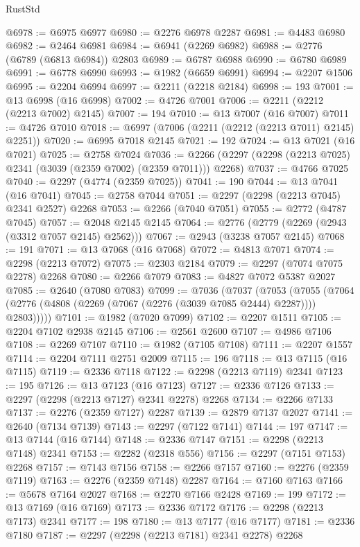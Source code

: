 \begin{lexlean}{RustStd}
\begin{coremodule}
@6978 := @6975 @6977
@6980 := @2276 @6978 @2287
@6981 := @4483 @6980
@6982 := @2464 @6981
@6984 := @6941 (@2269 @6982)
@6988 := @2776 (@6789 (@6813 @6984)) @2803
@6989 := @6787 @6988
@6990 := @6780 @6989
@6991 := @6778 @6990
@6993 := @1982 (@6659 @6991)
@6994 := @2207 @1506
@6995 := @2204 @6994
@6997 := @2211 (@2218 @2184)
@6998 := 193
@7001 := @13 @6998 (@16 @6998)
@7002 := @4726 @7001
@7006 := @2211 (@2212 (@2213 @7002) @2145)
@7007 := 194
@7010 := @13 @7007 (@16 @7007)
@7011 := @4726 @7010
@7018 := @6997 (@7006 (@2211 (@2212 (@2213 @7011) @2145) @2251))
@7020 := @6995 @7018 @2145
@7021 := 192
@7024 := @13 @7021 (@16 @7021)
@7025 := @2758 @7024
@7036 := @2266 (@2297 (@2298 (@2213 @7025) @2341 (@3039 (@2359 @7002) (@2359 @7011))) @2268)
@7037 := @4766 @7025
@7040 := @2297 (@4774 (@2359 @7025))
@7041 := 190
@7044 := @13 @7041 (@16 @7041)
@7045 := @2758 @7044
@7051 := @2297 (@2298 (@2213 @7045) @2341 @2527) @2268
@7053 := @2266 (@7040 @7051)
@7055 := @2772 (@4787 @7045)
@7057 := @2048 @2145 @2145
@7064 := @2776 (@2779 (@2269 (@2943 (@3312 @7057 @2145) @2562)))
@7067 := @2943 (@3238 @7057 @2145)
@7068 := 191
@7071 := @13 @7068 (@16 @7068)
@7072 := @4813 @7071
@7074 := @2298 (@2213 @7072)
@7075 := @2303 @2184
@7079 := @2297 (@7074 @7075 @2278) @2268
@7080 := @2266 @7079
@7083 := @4827 @7072 @5387 @2027
@7085 := @2640 (@7080 @7083)
@7099 := @7036
    (@7037
      (@7053
        (@7055 (@7064 (@2776 (@4808 (@2269 (@7067 (@2276 (@3039 @7085 @2444) @2287)))) @2803)))))
@7101 := @1982 (@7020 @7099)
@7102 := @2207 @1511
@7105 := @2204 @7102 @2938 @2145
@7106 := @2561 @2600
@7107 := @4986 @7106
@7108 := @2269 @7107
@7110 := @1982 (@7105 @7108)
@7111 := @2207 @1557
@7114 := @2204 @7111 @2751 @2009
@7115 := 196
@7118 := @13 @7115 (@16 @7115)
@7119 := @2336 @7118
@7122 := @2298 (@2213 @7119) @2341
@7123 := 195
@7126 := @13 @7123 (@16 @7123)
@7127 := @2336 @7126
@7133 := @2297 (@2298 (@2213 @7127) @2341 @2278) @2268
@7134 := @2266 @7133
@7137 := @2276 (@2359 @7127) @2287
@7139 := @2879 @7137 @2027
@7141 := @2640 (@7134 @7139)
@7143 := @2297 (@7122 @7141)
@7144 := 197
@7147 := @13 @7144 (@16 @7144)
@7148 := @2336 @7147
@7151 := @2298 (@2213 @7148) @2341
@7153 := @2282 (@2318 @556)
@7156 := @2297 (@7151 @7153) @2268
@7157 := @7143 @7156
@7158 := @2266 @7157
@7160 := @2276 (@2359 @7119)
@7163 := @2276 (@2359 @7148) @2287
@7164 := @7160 @7163
@7166 := @5678 @7164 @2027
@7168 := @2270 @7166 @2428
@7169 := 199
@7172 := @13 @7169 (@16 @7169)
@7173 := @2336 @7172
@7176 := @2298 (@2213 @7173) @2341
@7177 := 198
@7180 := @13 @7177 (@16 @7177)
@7181 := @2336 @7180
@7187 := @2297 (@2298 (@2213 @7181) @2341 @2278) @2268

\end{coremodule}
\end{lexlean}
